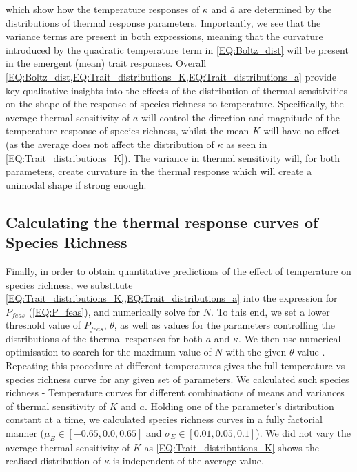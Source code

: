 \documentclass{article}
\begin{document}
which show how the temperature responses of $\kappa$ and $\bar{a}$ are determined by the distributions of thermal response parameters. Importantly, we see that the variance terms are present in both expressions, meaning that the curvature introduced by the quadratic temperature term in \cref{EQ:Boltz_dist} will be present in the emergent (mean) trait responses. Overall \cref{EQ:Boltz_dist,EQ:Trait_distributions_K,EQ:Trait_distributions_a} provide key qualitative insights into the effects of the distribution of thermal sensitivities on the shape of the response of species richness to temperature. Specifically, the average thermal sensitivity of $a$ will control the direction and magnitude of the temperature response of species richness, whilst the mean $K$ will have no effect (as the average does not affect the distribution of $\kappa$ as seen in \cref{EQ:Trait_distributions_K}). The variance in thermal sensitivity will, for both parameters, create curvature in the thermal response which will create a unimodal shape if strong enough. 

\subsection*{Calculating the thermal response curves of Species Richness} \label{SEC:Temp_SP_num}

Finally, in order to obtain quantitative predictions of the effect of temperature on species richness,  we substitute \cref{EQ:Trait_distributions_K,,EQ:Trait_distributions_a} into the expression for $P_{feas}$ (\cref{EQ:P_feas}), and numerically solve for $N$. To this end, we set a lower threshold value of $P_{feas}$, $\theta$, as well as values for the parameters controlling the distributions of the thermal responses for both $a$ and $\kappa$. We then use numerical optimisation to search for the maximum value of $N$ with the given $\theta$ value \citep{Mogensen2018}. Repeating this procedure at different temperatures gives the full temperature vs species richness curve for any given set of parameters. We calculated such species richness - Temperature curves for different combinations of means and variances of thermal sensitivity of $K$ and $a$. Holding one of the parameter's distribution constant at a time, we calculated species richness curves in a fully factorial manner ($\mu_{E} \in [-0.65, 0.0, 0.65]$ and $\sigma_{E} \in [0.01, 0.05, 0.1]$). We did not vary the average thermal sensitivity of $K$ as \cref{EQ:Trait_distributions_K} shows the realised distribution of $\kappa$ is independent of the average value.
\end{document}
